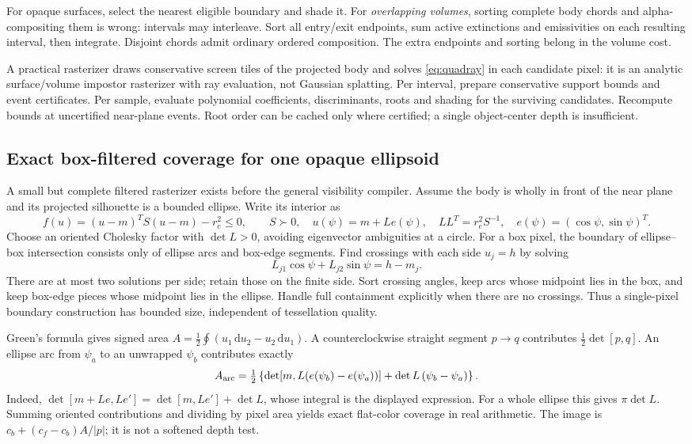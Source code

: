 \documentclass[10pt,letterpaper]{article}
\theoremstyle{remark}\newtheorem{counterexample}[proposition]{Counterexample}
\newcommand{\dd}{\,\mathrm d}
\begin{document}
For opaque surfaces, select the nearest eligible boundary and shade it. For \emph{overlapping volumes}, sorting complete body chords and alpha-compositing them is wrong: intervals may interleave. Sort all entry/exit endpoints, sum active extinctions and emissivities on each resulting interval, then integrate. Disjoint chords admit ordinary ordered composition. The extra endpoints and sorting belong in the volume cost.

A practical rasterizer draws conservative screen tiles of the projected body and solves \eqref{eq:quadray} in each candidate pixel: it is an analytic surface/volume impostor rasterizer with ray evaluation, not Gaussian splatting. Per interval, prepare conservative support bounds and event certificates. Per sample, evaluate polynomial coefficients, discriminants, roots and shading for the surviving candidates. Recompute bounds at uncertified near-plane events. Root order can be cached only where certified; a single object-center depth is insufficient.

\subsection{Exact box-filtered coverage for one opaque ellipsoid}
A small but complete filtered rasterizer exists before the general visibility compiler. Assume the body is wholly in front of the near plane and its projected silhouette is a bounded ellipse. Write its interior as
\begin{equation}
 f(u)=(u-m)^TS(u-m)-r_e^2\leq0,\qquad S\succ0,\quad
 u(\psi)=m+Le(\psi),\quad LL^T=r_e^2S^{-1},\quad
 e(\psi)=(\cos\psi,\sin\psi)^T.
\end{equation}
Choose an oriented Cholesky factor with $\det L>0$, avoiding eigenvector ambiguities at a circle. For a box pixel, the boundary of ellipse--box intersection consists only of ellipse arcs and box-edge segments. Find crossings with each side $u_j=h$ by solving
\begin{equation}
 L_{j1}\cos\psi+L_{j2}\sin\psi=h-m_j.
\end{equation}
There are at most two solutions per side; retain those on the finite side. Sort crossing angles, keep arcs whose midpoint lies in the box, and keep box-edge pieces whose midpoint lies in the ellipse. Handle full containment explicitly when there are no crossings. Thus a single-pixel boundary construction has bounded size, independent of tessellation quality.

Green's formula gives signed area $A=\frac12\oint(u_1\dd u_2-u_2\dd u_1)$. A counterclockwise straight segment $p\to q$ contributes $\frac12\det[p,q]$. An ellipse arc from $\psi_a$ to an unwrapped $\psi_b$ contributes exactly
\begin{equation}
 A_{\rm arc}=\tfrac12\left\{\det\!\left[m,L(e(\psi_b)-e(\psi_a))\right]
                  +\det L\,(\psi_b-\psi_a)\right\}. \label{eq:arcarea}
\end{equation}
Indeed, $\det[m+Le,Le']=\det[m,Le']+\det L$, whose integral is the displayed expression. For a whole ellipse this gives $\pi\det L$. Summing oriented contributions and dividing by pixel area yields exact flat-color coverage in real arithmetic. The image is $c_b+(c_f-c_b)A/|p|$; it is not a softened depth test.
\end{document}
